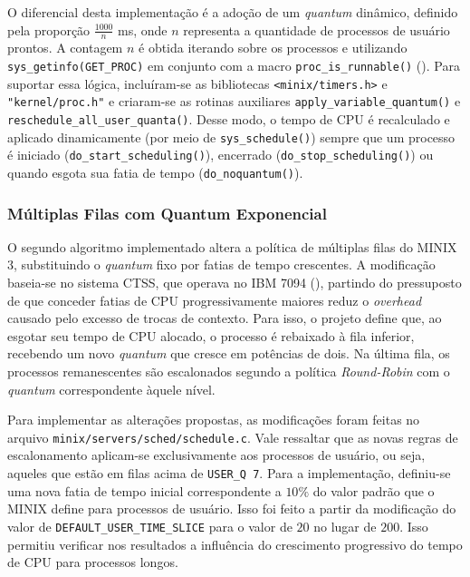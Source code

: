 \documentclass[12pt]{article}
\begin{document}
O diferencial desta implementação é a adoção de um \textit{quantum} dinâmico, definido pela proporção $\frac{1000}{n}$ ms, onde $n$ representa a quantidade de processos de usuário prontos. A contagem $n$ é obtida iterando sobre os processos e utilizando \texttt{sys\_getinfo(GET\_PROC)} em conjunto com a macro \texttt{proc\_is\_runnable()} (\cite{minix3wiki}). Para suportar essa lógica, incluíram-se as bibliotecas \texttt{<minix/timers.h>} e \texttt{"kernel/proc.h"} e criaram-se as rotinas auxiliares \texttt{apply\_variable\_quantum()} e \texttt{reschedule\_all\_user\_quanta()}. Desse modo, o tempo de CPU é recalculado e aplicado dinamicamente (por meio de \texttt{sys\_schedule()}) sempre que um processo é iniciado (\texttt{do\_start\_scheduling()}), encerrado (\texttt{do\_stop\_scheduling()}) ou quando esgota sua fatia de tempo (\texttt{do\_noquantum()}).
\vspace{-10pt}
\subsubsection{Múltiplas Filas com Quantum Exponencial}
\vspace{-10pt}
O segundo algoritmo implementado altera a política de múltiplas filas do MINIX 3, substituindo o \textit{quantum} fixo por fatias de tempo crescentes. A modificação baseia-se no sistema CTSS, que operava no IBM 7094 (\cite[p. 111]{tanenbaum}), partindo do pressuposto de que conceder fatias de CPU progressivamente maiores reduz o \textit{overhead} causado pelo excesso de trocas de contexto. Para isso, o projeto define que, ao esgotar seu tempo de CPU alocado, o processo é rebaixado à fila inferior, recebendo um novo \textit{quantum} que cresce em potências de dois. Na última fila, os processos remanescentes são escalonados segundo a política \textit{Round-Robin} com o \textit{quantum} correspondente àquele nível.

Para implementar as alterações propostas, as modificações foram feitas no arquivo \texttt{minix/servers/sched/schedule.c}. Vale ressaltar que as novas regras de escalonamento aplicam-se exclusivamente aos processos de usuário, ou seja, aqueles que estão em filas acima de \texttt{USER\_Q 7}. Para a implementação, definiu-se uma nova fatia de tempo inicial correspondente a $10\%$ do valor padrão que o MINIX define para processos de usuário. Isso foi feito a partir da modificação do valor de \texttt{DEFAULT\_USER\_TIME\_SLICE} para o valor de $20$ no lugar de $200$. Isso permitiu verificar nos resultados a influência do crescimento progressivo do tempo de CPU para processos longos.
\end{document}
